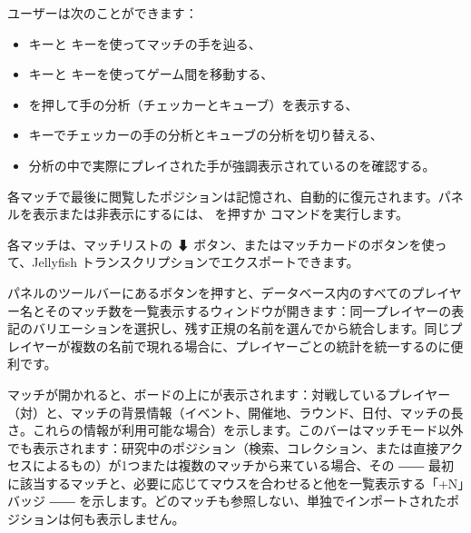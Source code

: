 \documentclass[letterpaper,10pt,dvipdfmx]{sphinxmanual}
\begin{document}
\sphinxAtStartPar
ユーザーは次のことができます：
\begin{itemize}
\item {} 
\sphinxAtStartPar
{} キーと  キーを使ってマッチの手を辿る、

\item {} 
\sphinxAtStartPar
{} キーと  キーを使ってゲーム間を移動する、

\item {} 
\sphinxAtStartPar
{} を押して手の分析（チェッカーとキューブ）を表示する、

\item {} 
\sphinxAtStartPar
{} キーでチェッカーの手の分析とキューブの分析を切り替える、

\item {} 
\sphinxAtStartPar
分析の中で実際にプレイされた手が強調表示されているのを確認する。

\end{itemize}

\sphinxAtStartPar
各マッチで最後に閲覧したポジションは記憶され、自動的に復元されます。パネルを表示または非表示にするには、 を押すか  コマンドを実行します。

\sphinxAtStartPar
各マッチは、マッチリストの ⬇ ボタン、またはマッチカードのボタンを使って、Jellyfish  トランスクリプションでエクスポートできます。

\sphinxAtStartPar
パネルのツールバーにあるボタンを押すと、データベース内のすべてのプレイヤー名とそのマッチ数を一覧表示するウィンドウが開きます：同一プレイヤーの表記のバリエーションを選択し、残す正規の名前を選んでから統合します。同じプレイヤーが複数の名前で現れる場合に、プレイヤーごとの統計を統一するのに便利です。

\sphinxAtStartPar
マッチが開かれると、ボードの上にが表示されます：対戦しているプレイヤー（対）と、マッチの背景情報（イベント、開催地、ラウンド、日付、マッチの長さ。これらの情報が利用可能な場合）を示します。このバーはマッチモード以外でも表示されます：研究中のポジション（検索、コレクション、または直接アクセスによるもの）が1つまたは複数のマッチから来ている場合、その ―― 最初に該当するマッチと、必要に応じてマウスを合わせると他を一覧表示する「+N」バッジ ―― を示します。どのマッチも参照しない、単独でインポートされたポジションは何も表示しません。
\end{document}
